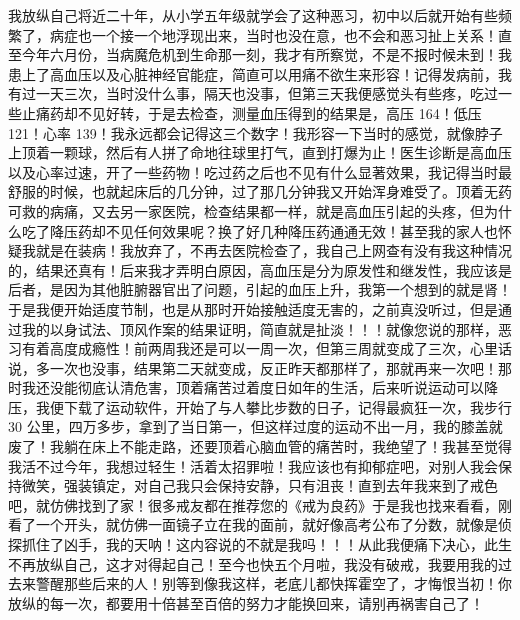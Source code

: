 \begin{case}\label{126.2}
    我放纵自己将近二十年，从小学五年级就学会了这种恶习，初中以后就开始有些频繁了，病症也一个接一个地浮现出来，当时也没在意，也不会和恶习扯上关系！直至今年六月份，当病魔危机到生命那一刻，我才有所察觉，不是不报时候未到！我患上了高血压以及心脏神经官能症，简直可以用痛不欲生来形容！记得发病前，我有过一天三次，当时没什么事，隔天也没事，但第三天我便感觉头有些疼，吃过一些止痛药却不见好转，于是去检查，测量血压得到的结果是，高压 164！低压 121！心率 139！我永远都会记得这三个数字！我形容一下当时的感觉，就像脖子上顶着一颗球，然后有人拼了命地往球里打气，直到打爆为止！医生诊断是高血压以及心率过速，开了一些药物！吃过药之后也不见有什么显著效果，我记得当时最舒服的时候，也就起床后的几分钟，过了那几分钟我又开始浑身难受了。顶着无药可救的病痛，又去另一家医院，检查结果都一样，就是高血压引起的头疼，但为什么吃了降压药却不见任何效果呢？换了好几种降压药通通无效！甚至我的家人也怀疑我就是在装病！我放弃了，不再去医院检查了，我自己上网查有没有我这种情况的，结果还真有！后来我才弄明白原因，高血压是分为原发性和继发性，我应该是后者，是因为其他脏腑器官出了问题，引起的血压上升，我第一个想到的就是肾！于是我便开始适度节制，也是从那时开始接触适度无害的，之前真没听过，但是通过我的以身试法、顶风作案的结果证明，简直就是扯淡！！！就像您说的那样，恶习有着高度成瘾性！前两周我还是可以一周一次，但第三周就变成了三次，心里话说，多一次也没事，结果第二天就变成，反正昨天都那样了，那就再来一次吧！那时我还没能彻底认清危害，顶着痛苦过着度日如年的生活，后来听说运动可以降压，我便下载了运动软件，开始了与人攀比步数的日子，记得最疯狂一次，我步行 30 公里，四万多步，拿到了当日第一，但这样过度的运动不出一月，我的膝盖就废了！我躺在床上不能走路，还要顶着心脑血管的痛苦时，我绝望了！我甚至觉得我活不过今年，我想过轻生！活着太招罪啦！我应该也有抑郁症吧，对别人我会保持微笑，强装镇定，对自己我只会保持安静，只有沮丧！直到去年我来到了戒色吧，就仿佛找到了家！很多戒友都在推荐您的《戒为良药》于是我也找来看看，刚看了一个开头，就仿佛一面镜子立在我的面前，就好像高考公布了分数，就像是侦探抓住了凶手，我的天呐！这内容说的不就是我吗！！！从此我便痛下决心，此生不再放纵自己，这才对得起自己！至今也快五个月啦，我没有破戒，我要用我的过去来警醒那些后来的人！别等到像我这样，老底儿都快挥霍空了，才悔恨当初！你放纵的每一次，都要用十倍甚至百倍的努力才能换回来，请别再祸害自己了！

\end{case}
